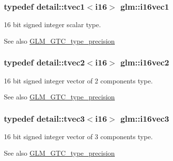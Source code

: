 \subsubsection[{i16vec1}]{\setlength{\rightskip}{0pt plus 5cm}typedef detail\+::tvec1$<$i16$>$ {\bf glm\+::i16vec1}}\label{group__gtc__type__precision_ga95c6d9b5d9d140fad7405496484ec622}
16 bit signed integer scalar type. \begin{DoxySeeAlso}{See also}
\hyperlink{group__gtc__type__precision}{G\+L\+M\+\_\+\+G\+T\+C\+\_\+type\+\_\+precision} 
\end{DoxySeeAlso}
\hypertarget{group__gtc__type__precision_gae6b6e6aecc629c6ba90ab75d2a555cdd}{}
\subsubsection[{i16vec2}]{\setlength{\rightskip}{0pt plus 5cm}typedef detail\+::tvec2$<$i16$>$ {\bf glm\+::i16vec2}}\label{group__gtc__type__precision_gae6b6e6aecc629c6ba90ab75d2a555cdd}
16 bit signed integer vector of 2 components type. \begin{DoxySeeAlso}{See also}
\hyperlink{group__gtc__type__precision}{G\+L\+M\+\_\+\+G\+T\+C\+\_\+type\+\_\+precision} 
\end{DoxySeeAlso}
\hypertarget{group__gtc__type__precision_ga431a95adcef90192c0c0f1a6fc05ab4e}{}
\subsubsection[{i16vec3}]{\setlength{\rightskip}{0pt plus 5cm}typedef detail\+::tvec3$<$i16$>$ {\bf glm\+::i16vec3}}\label{group__gtc__type__precision_ga431a95adcef90192c0c0f1a6fc05ab4e}
16 bit signed integer vector of 3 components type. \begin{DoxySeeAlso}{See also}
\hyperlink{group__gtc__type__precision}{G\+L\+M\+\_\+\+G\+T\+C\+\_\+type\+\_\+precision} 
\end{DoxySeeAlso}
\hypertarget{group__gtc__type__precision_gaa5ac58e1f15cc47ae8f11cf9849cd9be}{}
